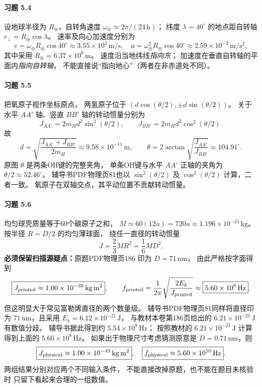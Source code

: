 \paragraph{习题 5.4}
设地球半径为 \(R_\oplus\)，自转角速度
\(\omega_\oplus\simeq2\pi/(24\,\mathrm h)\)；
纬度 \(\lambda=40^\circ\) 的地点距自转轴
\(r_\perp=R_\oplus\cos\lambda\)。
速率及向心加速度分别为
\[
 \boxed{v=\omega_\oplus R_\oplus\cos40^\circ
 \approx3.55\times10^2\,\mathrm{m/s}},\quad
 \boxed{a=\omega_\oplus^2R_\oplus\cos40^\circ
 \approx2.59\times10^{-2}\,\mathrm{m/s^2}},
\]
其中采用 \(R_\oplus=6.37\times10^6\,\mathrm m\)。
速度沿当地纬线\emph{指向东}；
加速度在垂直自转轴的平面内\emph{指向自转轴}，
不能直接说“指向地心”（两者在非赤道处不同）。

\paragraph{习题 5.5}
把氧原子视作坐标原点，
两氢原子位于
\((d\cos(\theta/2),\pm d\sin(\theta/2))\)。
关于水平 \(AA'\) 轴、竖直 \(BB'\) 轴的转动惯量分别为
\[
 J_{AA'}=2m_Hd^2\sin^2(\theta/2),\qquad
 J_{BB'}=2m_Hd^2\cos^2(\theta/2).
\]
故
\[
 \boxed{d=
 \sqrt{\frac{J_{AA'}+J_{BB'}}{2m_H}}
 \approx9.58\times10^{-11}\,\mathrm m},
\qquad
 \boxed{\theta=2\arctan\sqrt{\frac{J_{AA'}}{J_{BB'}}}
 \approx104.91^\circ}.
\]
原图 \(\theta\) 是两条OH键的完整夹角，
单条OH键与水平 \(AA'\) 正轴的夹角为
\(\theta/2\approx52.46^\circ\)。
辅导书PDF物理页81也以 \(\sin^2(\theta/2)\)
及 \(\cos^2(\theta/2)\) 计算，二者一致。
氧原子在双轴交点，其平动位置不贡献转动惯量。

\paragraph{习题 5.6}
均匀球壳质量等于60个碳原子之和，
\(M\simeq60(12u)=720u
 \approx1.196\times10^{-24}\,\mathrm{kg}\)。
按半径 \(R=D/2\) 的均匀薄球面，
绕任一直径的转动惯量
\[
 \boxed{J=\frac23MR^2=\frac16MD^2}.
\]
\textbf{必须保留扫描源疑点：}原题PDF物理页186
印为 \(D=71\,\mathrm{nm}\)，
由此严格按字面得到
\[
 \boxed{J_{\rm printed}\approx1.00\times10^{-39}
 \,\mathrm{kg\,m^2}},\qquad
 f_{\rm printed}=\frac1{2\pi}
 \sqrt{\frac{2E_k}{J_{\rm printed}}}
 \approx\boxed{5.60\times10^8\,\mathrm{Hz}}.
\]
但这明显大于常见富勒烯直径的两个数量级。
辅导书PDF物理页81同样将直径印为
\(71\,\mathrm{nm}\)，且采用
\(E_k=6.12\times10^{-21}\,\mathrm J\)，
与教材本卷第186页给出的
\(6.21\times10^{-21}\,\mathrm J\) 有数值分歧。
辅导书据此得到约 \(5.54\times10^8\,\mathrm{Hz}\)；
按照教材的 \(6.21\times10^{-21}\,\mathrm J\)
计算得到上面的 \(5.60\times10^8\,\mathrm{Hz}\)。
如果出于物理尺寸考虑猜测原意是
\(D=0.71\,\mathrm{nm}\)，则
\[
 \boxed{J_{\rm physical}\approx1.00\times10^{-43}
 \,\mathrm{kg\,m^2}},\quad
 \boxed{f_{\rm physical}\approx5.60\times10^{10}\,\mathrm{Hz}}.
\]
两组结果分别对应两个不同输入条件，
不能直接改掉原题，也不能在题目未核验时
只留下看起来合理的一组数值。

